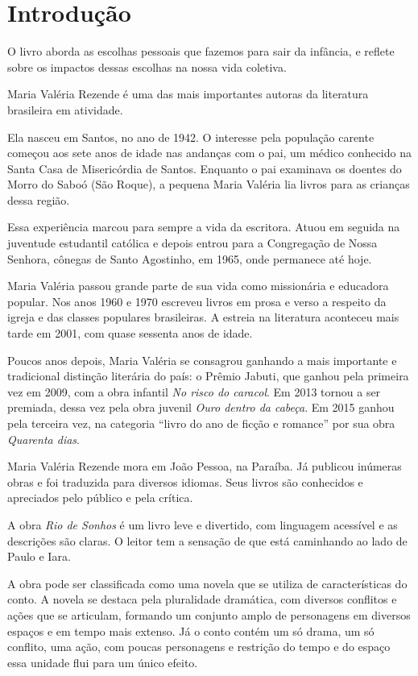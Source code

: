 \documentclass[12pt]{extarticle}
\begin{document}
\pagebreak\tableofcontents

\section{Introdução}

O livro aborda as escolhas pessoais que fazemos para sair da infância, e 
reflete sobre os impactos dessas escolhas na nossa vida coletiva.  

Maria Valéria Rezende é uma das mais importantes autoras da literatura brasileira em atividade.

Ela nasceu em Santos, no ano de 1942. 
O interesse pela população carente começou aos sete anos de idade nas andanças com o pai,
um médico conhecido na Santa Casa de Misericórdia de Santos. 
Enquanto o pai examinava os doentes do Morro do Saboó (São Roque), a pequena Maria Valéria lia 
livros para as crianças dessa região.

Essa experiência marcou para sempre a vida da escritora.
Atuou em seguida na juventude estudantil católica e depois entrou 
para a Congregação de Nossa Senhora, cônegas de Santo Agostinho,  
em 1965, onde permanece até hoje.

Maria Valéria  passou grande parte de sua vida como missionária e educadora popular.
Nos anos 1960 e 1970 escreveu livros em prosa e verso a respeito da igreja e das classes populares brasileiras.  
A estreia na literatura aconteceu mais tarde em 2001, com quase sessenta anos de idade.

Poucos anos depois, Maria Valéria se consagrou ganhando a mais importante e tradicional distinção literária do país: o Prêmio Jabuti, que ganhou pela primeira vez em 2009, com a obra infantil \textit{No risco do caracol}. 
Em 2013 tornou a ser premiada, dessa vez pela obra juvenil \textit{Ouro dentro da cabeça}.
Em 2015 ganhou pela terceira vez, na categoria ``livro do ano de ficção e romance'' por sua obra 
\textit{Quarenta dias}.

Maria Valéria Rezende mora em João Pessoa, na Paraíba. 
Já publicou inúmeras obras e foi traduzida para diversos idiomas.
Seus livros são conhecidos e apreciados pelo público e pela crítica.

A obra \textit{Rio de Sonhos}
é um livro leve e divertido, com linguagem acessível e as descrições são claras.
O leitor tem a sensação de que está caminhando ao lado de Paulo e Iara. 

A obra pode ser classificada como uma novela que se utiliza de características do conto. 
A novela se destaca pela pluralidade dramática, com diversos conflitos e ações que se articulam, formando um conjunto amplo de personagens em diversos espaços e em tempo mais extenso.
Já o conto contém um só drama, um só conflito, uma ação, com poucas personagens e restrição do tempo e do espaço essa unidade flui para um único efeito.
\end{document}
